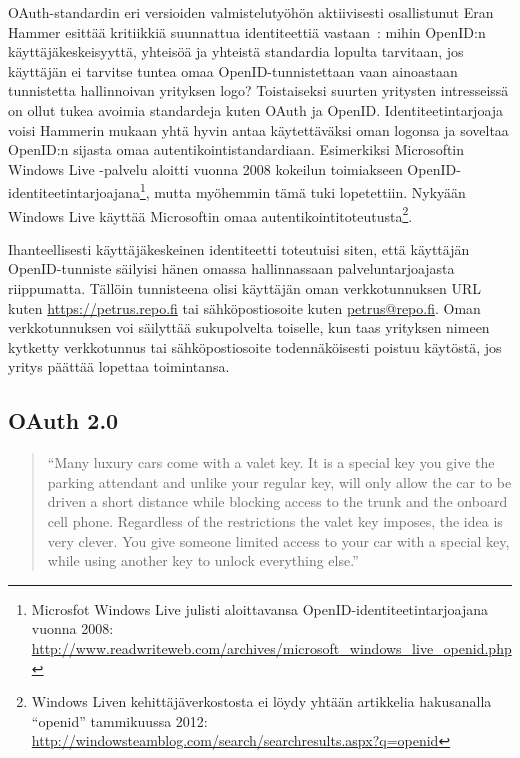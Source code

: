 \documentclass[finnish,gradu]{tktltiki}
\begin{document}
    OAuth-standardin eri versioiden valmistelutyöhön aktiivisesti osallistunut Eran Hammer esittää kritiikkiä suunnattua identiteettiä vastaan~\cite{hueniverse_openid_crisis}: mihin OpenID:n käyttäjäkeskeisyyttä, yhteisöä ja yhteistä standardia lopulta tarvitaan, jos käyttäjän ei tarvitse tuntea omaa OpenID-tunnistettaan vaan ainoastaan tunnistetta hallinnoivan yrityksen logo? Toistaiseksi suurten yritysten intresseissä on ollut tukea avoimia standardeja kuten OAuth ja OpenID. Identiteetintarjoaja voisi Hammerin mukaan yhtä hyvin antaa käytettäväksi oman logonsa ja soveltaa OpenID:n sijasta omaa autentikointistandardiaan. Esimerkiksi Microsoftin Windows Live -palvelu aloitti vuonna 2008  kokeilun toimiakseen OpenID-identiteetintarjoajana\footnote{Microsfot Windows Live julisti aloittavansa OpenID-identiteetintarjoajana vuonna 2008: \\ \url{http://www.readwriteweb.com/archives/microsoft_windows_live_openid.php}},
  mutta myöhemmin tämä tuki lopetettiin. Nykyään Windows Live käyttää Microsoftin omaa autentikointitoteutusta\footnote{Windows Liven kehittäjäverkostosta ei löydy yhtään artikkelia hakusanalla ``openid'' tammikuussa 2012: \url{http://windowsteamblog.com/search/searchresults.aspx?q=openid}}.

  Ihanteellisesti käyttäjäkeskeinen identiteetti toteutuisi siten, että käyttäjän OpenID-tunniste säilyisi hänen omassa hallinnassaan palveluntarjoajasta riippumatta. Tällöin tunnisteena olisi käyttäjän oman verkkotunnuksen URL kuten \url{https://petrus.repo.fi} tai sähköpostiosoite kuten \url{petrus@repo.fi}. Oman verkkotunnuksen voi säilyttää sukupolvelta toiselle, kun taas yrityksen nimeen kytketty verkkotunnus tai sähköpostiosoite todennäköisesti poistuu käytöstä, jos yritys päättää lopettaa toimintansa.





  \subsection{OAuth 2.0} %
  \label{sub:oauth}

  \begin{quote}
    ``Many luxury cars come with a valet key. It is a special key you give the parking attendant and unlike your regular key, will only allow the car to be driven a short distance while blocking access to the trunk and the onboard cell phone. Regardless of the restrictions the valet key imposes, the idea is very clever. You give someone limited access to your car with a special key, while using another key to unlock everything else.''~\cite{hueniverse_oauth_intro}
  \end{quote}
\end{document}
